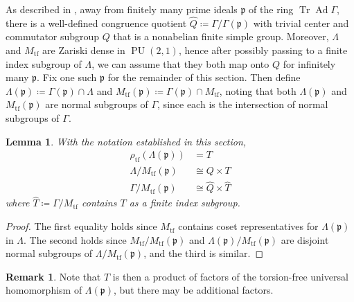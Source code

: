 \documentclass[11pt]{article}
\theoremstyle{plain}
\newtheorem{lem}[thm]{Lemma}
\theoremstyle{definition}
\newtheorem{rem}[thm]{Remark}
\theoremstyle{remark}
\newcommand{\frakp}{\mathfrak{p}}
\newcommand{\Gam}{\Gamma}
\newcommand{\Lam}{\Lambda}
\DeclareMathOperator{\PU}{PU}
\DeclareMathOperator{\Ad}{Ad}
\DeclareMathOperator{\Tr}{Tr}
\newcommand{\wh}{\widehat}
\newenvironment{pf}{\begin{proof}}{\end{proof}}
\begin{document}
As described in , away from finitely many prime ideals $\frakp$ of the ring $\Tr\Ad \Gam$, there is a well-defined congruence quotient $\wh{Q} \coloneqq \Gam / \Gam(\frakp)$ with trivial center and commutator subgroup $Q$ that is a nonabelian finite simple group. Moreover, $\Lam$ and $M_{\mathrm{tf}}$ are Zariski dense in $\PU(2,1)$, hence after possibly passing to a finite index subgroup of $\Lam$, we can assume that they both map onto $Q$ for infinitely many $\frakp$. Fix one such $\frakp$ for the remainder of this section. Then define $\Lam(\frakp) \coloneqq \Gam(\frakp) \cap \Lam$ and $M_{\mathrm{tf}}(\frakp) \coloneqq \Gam(\frakp) \cap M_{\mathrm{tf}}$, noting that both $\Lam(\frakp)$ and $M_{\mathrm{tf}}(\frakp)$ are normal subgroups of $\Gam$, since each is the intersection of normal subgroups of $\Gam$.

\begin{lem}\label{lem:QuoSetup}
With the notation established in this section,
\begin{align*}
\rho_{\mathrm{tf}}(\Lam(\frakp)) &= T \\
\Lam / M_{\mathrm{tf}}(\frakp) &\cong Q \times T \\
\Gam / M_{\mathrm{tf}}(\frakp) &\cong \wh{Q} \times \wh{T}
\end{align*}
where $\wh{T} \coloneqq \Gam / M_{\mathrm{tf}}$ contains $T$ as a finite index subgroup.
\end{lem}
\begin{pf}
The first equality holds since $M_{\mathrm{tf}}$ contains coset representatives for $\Lam(\frakp)$ in $\Lam$. The second holds since $M_{\mathrm{tf}} / M_{\mathrm{tf}}(\frakp)$ and $\Lam(\frakp) / M_{\mathrm{tf}}(\frakp)$ are disjoint normal subgroups of $\Lam / M_{\mathrm{tf}}(\frakp)$, and the third is similar.
\end{pf}

\begin{rem}
Note that $T$ is then a product of factors of the torsion-free universal homomorphism of $\Lam(\frakp)$, but there may be additional factors.
\end{rem}
\end{document}
